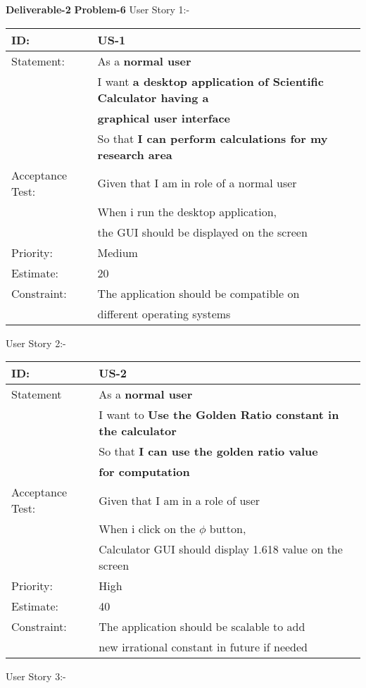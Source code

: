 \documentclass[12pt,a4paper]{article}
\begin{document}
\textbf{Deliverable-2}\newline
\textbf{Problem-6}\newline\newline
User Story 1:-
\begin{table}[h]
\centering
\begin{tabular}{|l|l|}
\hline
ID: &  US-1\\
\hline
Statement: & As a \textbf{normal user }\\ & I want \textbf{a desktop application of Scientific Calculator having a}\\ & \textbf{graphical user interface}\\
&So that \textbf{I can perform calculations for my research area}\\
\hline
Acceptance Test: & Given that I am in role of a normal user\\
& When i run the desktop application,\\& the GUI should be displayed on the screen \\
\hline
Priority: & Medium \\
\hline
Estimate: & 20\\
\hline
Constraint: & The application should be compatible on \\& different  operating systems\\
\hline
\end{tabular}
\end{table}
\newpage
User Story 2:-

\begin{table}[h]
\centering
\begin{tabular}{|l|l|}
\hline
ID: & US-2 \\
\hline
Statement & As a \textbf{normal user} \\
&I want to \textbf{Use the Golden Ratio constant in the calculator}   \\
& So that \textbf{I can use the golden ratio value} \\& \textbf{for computation}\\
\hline
Acceptance Test: & Given that I am in a role of user\\
& When i click on the $\phi$ button,\\&  Calculator GUI should display 1.618 value on the screen \\
\hline
Priority: & High \\
\hline
Estimate: & 40\\
\hline
Constraint: & The application should be scalable to add \\ &new irrational constant in future if needed\\
\hline
\end{tabular}
\end{table}
\newpage
User Story 3:-
\end{document}
